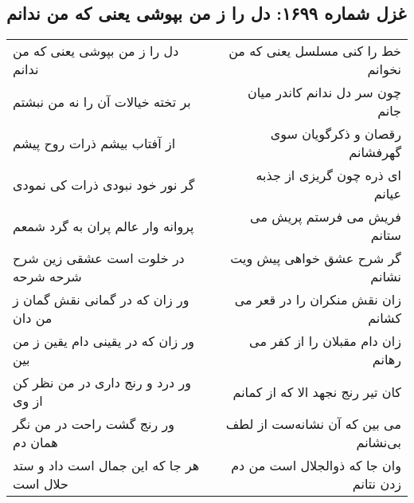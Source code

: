 \begin{center}
\section*{غزل شماره ۱۶۹۹: دل را ز من بپوشی یعنی که من ندانم}
\label{sec:1699}
\begin{longtable}{l p{0.5cm} r}
دل را ز من بپوشی یعنی که من ندانم
&&
خط را کنی مسلسل یعنی که من نخوانم
\\
بر تخته خیالات آن را نه من نبشتم
&&
چون سر دل ندانم کاندر میان جانم
\\
از آفتاب بیشم ذرات روح پیشم
&&
رقصان و ذکرگویان سوی گهرفشانم
\\
گر نور خود نبودی ذرات کی نمودی
&&
ای ذره چون گریزی از جذبه عیانم
\\
پروانه وار عالم پران به گرد شمعم
&&
فریش می فرستم پریش می ستانم
\\
در خلوت است عشقی زین شرح شرحه شرحه
&&
گر شرح عشق خواهی پیش ویت نشانم
\\
ور زان که در گمانی نقش گمان ز من دان
&&
زان نقش منکران را در قعر می کشانم
\\
ور زان که در یقینی دام یقین ز من بین
&&
زان دام مقبلان را از کفر می رهانم
\\
ور درد و رنج داری در من نظر کن از وی
&&
کان تیر رنج نجهد الا که از کمانم
\\
ور رنج گشت راحت در من نگر همان دم
&&
می بین که آن نشانه‌ست از لطف بی‌نشانم
\\
هر جا که این جمال است داد و ستد حلال است
&&
وان جا که ذوالجلال است من دم زدن نتانم
\\
\end{longtable}
\end{center}
